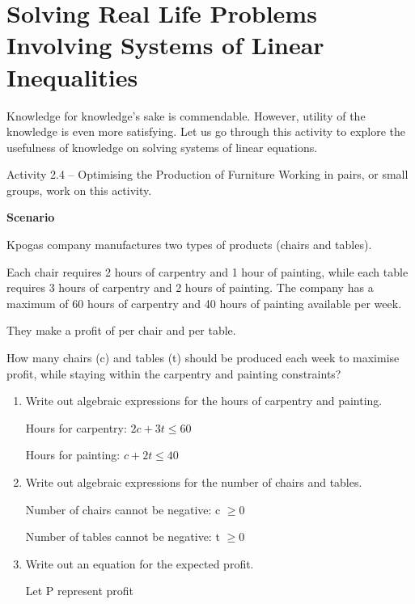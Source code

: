 \section{Solving Real Life Problems Involving Systems of Linear Inequalities}

Knowledge for knowledge's sake is commendable. However, utility of the
knowledge is even more satisfying. Let us go through this activity to explore the
usefulness of knowledge on solving systems of linear equations.

\begin{activity}{Activity 2.4 -- Optimising the Production of Furniture}
Working in pairs, or small groups, work on this activity.

\textbf{Scenario}

Kpogas company manufactures two types of products (chairs and tables).

Each chair requires 2 hours of carpentry and 1 hour of painting, while each
table requires 3 hours of carpentry and 2 hours of painting. The company has
a maximum of 60 hours of carpentry and 40 hours of painting available per
week.

They make a profit of  per chair and  per table.

How many chairs (c) and tables (t) should be produced each week to maximise
profit, while staying within the carpentry and painting constraints?

\solution
\begin{enumerate}
  \item Write out algebraic expressions for the hours of carpentry and painting.

  Hours for carpentry: $2c + 3t \le 60$

  Hours for painting: $c + 2t \le 40$
  \item Write out algebraic expressions for the number of chairs and tables.

  Number of chairs cannot be negative: c $\ge 0$

  Number of tables cannot be negative: t $\ge 0$
  \item Write out an equation for the expected profit.

  Let P represent profit


\end{enumerate}
\end{activity}
